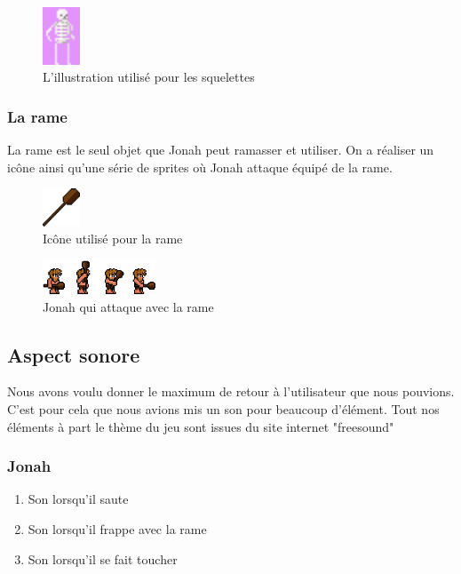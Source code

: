 \documentclass{prologArticle}
\begin{document}
\begin{figure}[H]
    \centering
    \includegraphics[width=0.1\textwidth]{res/Skeleton.png}
    \caption{L'illustration utilisé pour les squelettes}
\end{figure}

\subsubsection{La rame}

La rame est le seul objet que Jonah peut ramasser et utiliser. On a réaliser un icône ainsi qu'une série de sprites où Jonah attaque équipé de la rame.

\begin{figure}[H]
    \centering
    \includegraphics[width=0.1\textwidth]{res/rame.png}
    \caption{Icône utilisé pour la rame}
\end{figure}

\begin{figure}[H]
    \centering
    \includegraphics[width=0.3\textwidth]{res/jonaharmed.png}
    \caption{Jonah qui attaque avec la rame}
\end{figure}

\subsection{Aspect sonore}
Nous avons voulu donner le maximum de retour à l'utilisateur que nous pouvions. C'est pour cela que nous avions mis un son pour beaucoup d'élément. Tout nos éléments à part le thème du jeu sont issues du site internet "freesound"

\subsubsection{Jonah}
\begin{enumerate}
    \item Son lorsqu'il saute
    \item Son lorsqu'il frappe avec la rame
    \item Son lorsqu'il se fait toucher
\end{enumerate}
\end{document}

